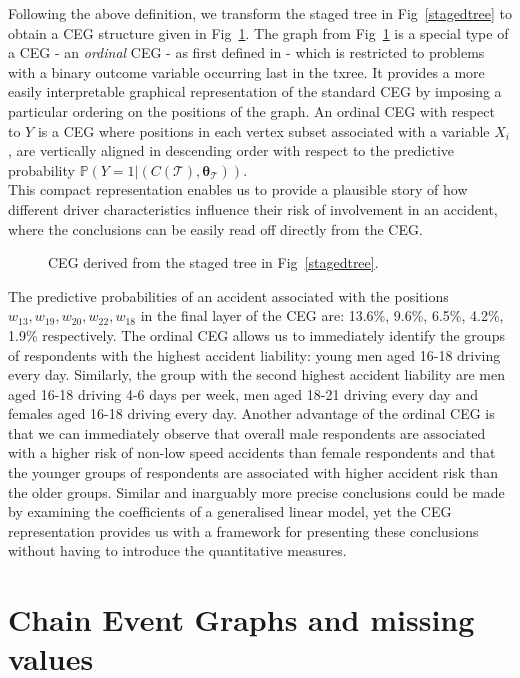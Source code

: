 \documentclass[runningheads]{llncs}
\begin{document}
Following the above definition, we transform the staged tree in Fig~\ref{stagedtree} to obtain a CEG structure given in Fig~\ref{ceg:freq-acc}. The graph from Fig~\ref{ceg:freq-acc} is a special type of a CEG - an \emph{ordinal} CEG -  as first defined in \cite{barclay2014missingness} - which is restricted to problems with a binary outcome variable occurring last in the txree. It provides a more easily interpretable graphical representation of the standard CEG by imposing a particular ordering on the positions of the graph. An ordinal CEG with respect to $Y$ is a CEG where positions in each vertex subset associated with a variable $X_i$, are vertically aligned in descending order with respect to the predictive probability $\mathbb{P}(Y = 1|(C(\mathcal{T}) , \boldsymbol{\theta}_{\mathcal{T}}))$. \\
This compact representation enables us to provide a plausible story of how different driver characteristics influence their risk of involvement in an accident, where the conclusions can be easily read off directly from the CEG.
\begin{figure}
\centering

\caption{CEG derived from the staged tree in Fig~\ref{stagedtree}.}
\label{ceg:freq-acc}
\end{figure}
The predictive probabilities of an accident associated with the positions $w_{13}, w_{19}, w_{20}, w_{22}, w_{18}$ in the final layer of the CEG are: 13.6\%, 9.6\%, 6.5\%, 4.2\%, 1.9\% respectively.
The ordinal CEG allows us to immediately identify the groups of respondents with the highest accident liability: young men aged 16-18 driving every day. Similarly, the group with the second highest accident liability are men aged 16-18 driving 4-6 days per week, men aged 18-21 driving every day and females aged 16-18 driving every day. Another advantage of the ordinal CEG is that we can immediately observe that overall male respondents are associated with a higher risk of non-low speed accidents than female respondents and that the younger groups of respondents are associated with higher accident risk than the older groups. Similar and inarguably more precise conclusions could be made by examining the coefficients of a generalised linear model, yet the CEG representation provides us with a framework for presenting these conclusions without having to introduce the quantitative measures. 

\section{Chain Event Graphs and missing values}\label{sec:missing}
\end{document}
